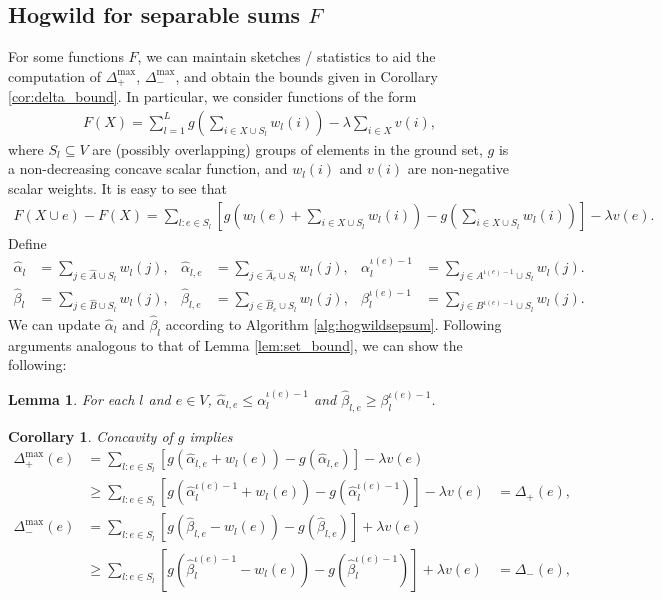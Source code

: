 \documentclass{article} %
\newtheorem{cor}[thm]{Corollary}
\newtheorem{lem}[thm]{Lemma}
\begin{document}
\subsection{Hogwild for separable sums $F$}
For some functions $F$, we can maintain sketches / statistics to aid the computation of $\Delta_+^{\max}$, $\Delta_-^{\max}$, and obtain the bounds given in Corollary \ref{cor:delta_bound}.
In particular, we consider functions of the form
\begin{align*}
F(X) = \sum_{l=1}^L g\left(\sum_{i\in X\cup S_l} w_l(i)\right) - \lambda\sum_{i\in X} v(i),
\end{align*}
where $S_l \subseteq V$ are (possibly overlapping) groups of elements in the ground set, $g$ is a non-decreasing concave scalar function, and $w_l(i)$ and $v(i)$ are non-negative scalar weights.
It is easy to see that
\begin{align*}
F(X \cup e) - F(X) = \sum_{l: e\in S_l} \left[g\left(w_l(e) + \sum_{i\in X\cup S_l} w_l(i)\right) - g\left(\sum_{i\in X\cup S_l} w_l(i)\right)\right] - \lambda v(e).
\end{align*}
Define
\begin{align*}
  \hat\alpha_l              &= \sum_{j\in \hat{A}\cup S_l} w_l(j),
& \hat\alpha_{l,e}          &= \sum_{j\in \hat{A}_e\cup S_l} w_l(j),
& \alpha_l^{\iota(e)-1} &= \sum_{j\in A^{\iota(e)-1}\cup S_l} w_l(j).\\
  \hat\beta_l              &= \sum_{j\in \hat{B}\cup S_l} w_l(j),
& \hat\beta_{l,e}          &= \sum_{j\in \hat{B}_e\cup S_l} w_l(j),
& \beta_l^{\iota(e)-1} &= \sum_{j\in B^{\iota(e)-1}\cup S_l} w_l(j).
\end{align*}
We can update $\hat\alpha_l$ and $\hat\beta_l$ according to Algorithm \ref{alg:hogwildsepsum}.
Following arguments analogous to that of Lemma \ref{lem:set_bound}, we can show the following:

\begin{lem} For each $l$ and $e\in V$, $\hat\alpha_{l,e} \leq \alpha_l^{\iota(e)-1}$ and $\hat\beta_{l,e} \geq \beta_l^{\iota(e)-1}$.
\end{lem}

\begin{cor} Concavity of $g$ implies
\begin{align*}
\Delta_+^{\max}(e)
&= \sum_{l:e\in S_l} \left[g(\hat\alpha_{l,e} + w_l(e)) - g(\hat\alpha_{l,e})\right] - \lambda v(e)\\
&\geq \sum_{l:e\in S_l} \left[g(\hat\alpha_l^{\iota(e)-1} + w_l(e)) - g(\hat\alpha_l^{\iota(e)-1})\right] - \lambda v(e)
&= \Delta_+(e),\\
\Delta_-^{\max}(e)
&= \sum_{l:e\in S_l} \left[g(\hat\beta_{l,e} - w_l(e)) - g(\hat\beta_{l,e})\right] + \lambda v(e)\\
&\geq \sum_{l:e\in S_l} \left[g(\hat\beta_l^{\iota(e)-1} - w_l(e)) - g(\hat\beta_l^{\iota(e)-1})\right] + \lambda v(e)
&= \Delta_-(e),
\end{align*}
\end{cor}
\end{document}
